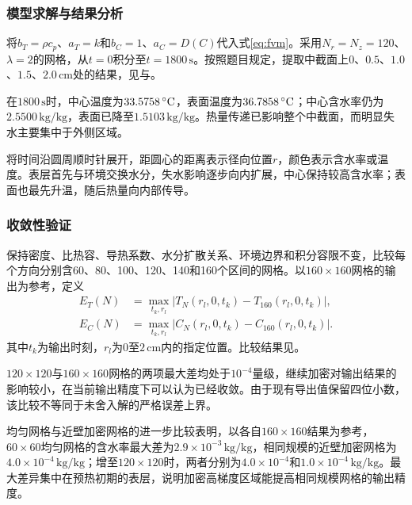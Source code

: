 \subsubsection{模型求解与结果分析}
将$b_T=\rho c_p$、$a_T=k$和$b_C=1$、$a_C=D(C)$代入式\eqref{eq:fvm}。采用$N_r=N_z=120$、$\lambda=2$的网格，从$t=0$积分至$t=1800\,\mathrm{s}$。按照题目规定，提取中截面上$0$、$0.5$、$1.0$、$1.5$、$2.0\,\mathrm{cm}$处的结果，见与。



在$1800\,\mathrm{s}$时，中心温度为$33.5758\,{}^\circ\mathrm{C}$，表面温度为$36.7858\,{}^\circ\mathrm{C}$；中心含水率仍为$2.5500\,\mathrm{kg/kg}$，表面已降至$1.5103\,\mathrm{kg/kg}$。热量传递已影响整个中截面，而明显失水主要集中于外侧区域。

将时间沿圆周顺时针展开，距圆心的距离表示径向位置$r$，颜色表示含水率或温度。表层首先与环境交换水分，失水影响逐步向内扩展，中心保持较高含水率；表面也最先升温，随后热量向内部传导。

\subsubsection{收敛性验证}
保持密度、比热容、导热系数、水分扩散关系、环境边界和积分容限不变，比较每个方向分别含60、80、100、120、140和160个区间的网格。以$160\times160$网格的输出为参考，定义
\begin{equation}\label{eq:error}
\begin{aligned}
E_T(N)&=\max_{t_k,r_l}|T_N(r_l,0,t_k)-T_{160}(r_l,0,t_k)|,\\
E_C(N)&=\max_{t_k,r_l}|C_N(r_l,0,t_k)-C_{160}(r_l,0,t_k)|.
\end{aligned}
\end{equation}
其中$t_k$为输出时刻，$r_l$为$0$至$2\,\mathrm{cm}$内的指定位置。比较结果见。


$120\times120$与$160\times160$网格的两项最大差均处于$10^{-4}$量级，继续加密对输出结果的影响较小，在当前输出精度下可以认为已经收敛。由于现有导出值保留四位小数，该比较不等同于未舍入解的严格误差上界。

均匀网格与近壁加密网格的进一步比较表明，以各自$160\times160$结果为参考，$60\times60$均匀网格的含水率最大差为$2.9\times10^{-3}\,\mathrm{kg/kg}$，相同规模的近壁加密网格为$4.0\times10^{-4}\,\mathrm{kg/kg}$；增至$120\times120$时，两者分别为$4.0\times10^{-4}$和$1.0\times10^{-4}\,\mathrm{kg/kg}$。最大差异集中在预热初期的表层，说明加密高梯度区域能提高相同规模网格的输出精度。

